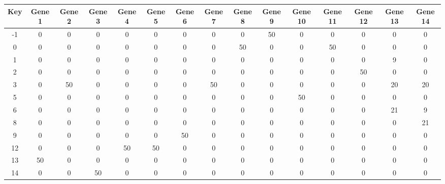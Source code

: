 \begin{tabular}{|c|c|c|c|c|c|c|c|c|c|c|c|c|c|c|}
\hline
Key & Gene 1 & Gene 2 & Gene 3 & Gene 4 & Gene 5 & Gene 6 & Gene 7 & Gene 8 & Gene 9 & Gene 10 & Gene 11 & Gene 12 & Gene 13 & Gene 14 \\
\hline
-1 & 0 & 0 & 0 & 0 & 0 & 0 & 0 & 0 & 50 & 0 & 0 & 0 & 0 & 0 \\
0 & 0 & 0 & 0 & 0 & 0 & 0 & 0 & 50 & 0 & 0 & 50 & 0 & 0 & 0 \\
1 & 0 & 0 & 0 & 0 & 0 & 0 & 0 & 0 & 0 & 0 & 0 & 0 & 9 & 0 \\
2 & 0 & 0 & 0 & 0 & 0 & 0 & 0 & 0 & 0 & 0 & 0 & 50 & 0 & 0 \\
3 & 0 & 50 & 0 & 0 & 0 & 0 & 50 & 0 & 0 & 0 & 0 & 0 & 20 & 20 \\
5 & 0 & 0 & 0 & 0 & 0 & 0 & 0 & 0 & 0 & 50 & 0 & 0 & 0 & 0 \\
6 & 0 & 0 & 0 & 0 & 0 & 0 & 0 & 0 & 0 & 0 & 0 & 0 & 21 & 9 \\
8 & 0 & 0 & 0 & 0 & 0 & 0 & 0 & 0 & 0 & 0 & 0 & 0 & 0 & 21 \\
9 & 0 & 0 & 0 & 0 & 0 & 50 & 0 & 0 & 0 & 0 & 0 & 0 & 0 & 0 \\
12 & 0 & 0 & 0 & 50 & 50 & 0 & 0 & 0 & 0 & 0 & 0 & 0 & 0 & 0 \\
13 & 50 & 0 & 0 & 0 & 0 & 0 & 0 & 0 & 0 & 0 & 0 & 0 & 0 & 0 \\
14 & 0 & 0 & 50 & 0 & 0 & 0 & 0 & 0 & 0 & 0 & 0 & 0 & 0 & 0 \\
\hline
\end{tabular}